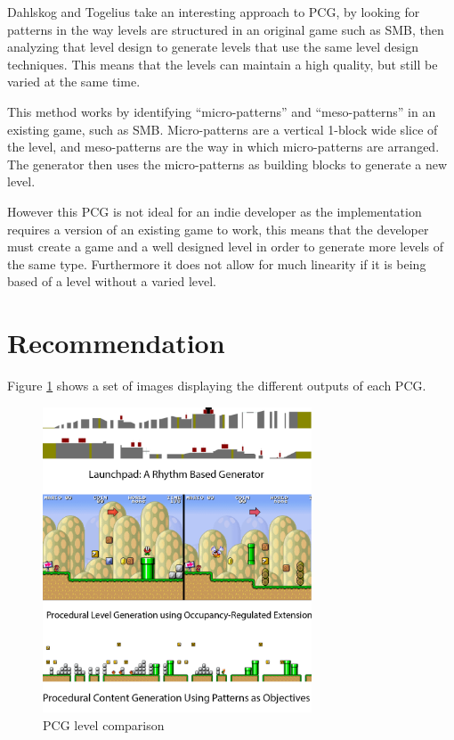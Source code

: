\documentclass{scrartcl}
\begin{document}
Dahlskog and Togelius take an interesting approach to PCG, by looking for patterns in the way levels are structured in an original game such as SMB, then analyzing that level design to generate levels that use the same level design techniques. This means that the levels can maintain a high quality, but still be varied at the same time.

This method works by identifying ``micro-patterns'' and ``meso-patterns'' in an existing game, such as SMB. Micro-patterns are a vertical 1-block wide slice of the level, and meso-patterns are the way in which micro-patterns are arranged. The generator then uses the micro-patterns as building blocks to generate a new level.

However this PCG is not ideal for an indie developer as the implementation requires a version of an existing game to work, this means that the developer must create a game and a well designed level in order to generate more levels of the same type. Furthermore it does not allow for much linearity if it is being based of a level without a varied level.







\section{Recommendation}

Figure \ref{fig:PCG} shows a set of images displaying the different outputs of each PCG.


\begin{figure}[h]
\includegraphics[width=8cm]{archtecture-images}
    \caption{PCG level comparison}
    \label{fig:PCG}
\end{figure}
\end{document}

